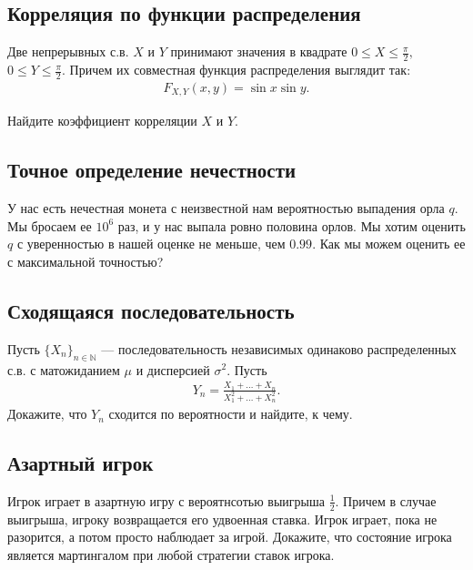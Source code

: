 \documentclass[12pt]{article}
\newcommand\N{\mathbb{N}}
\begin{document}
\subsection{Корреляция по функции распределения}

Две непрерывных с.в. $X$ и $Y$ принимают значения в квадрате $0 \le X \le \frac{\pi}{2},$ $0 \le Y \le \frac{\pi}{2}$. Причем их совместная функция распределения выглядит так:
\begin{align*}
    F_{X, Y} (x, y) = \sin x \sin y.
\end{align*}

Найдите коэффициент корреляции $X$ и $Y$.



\subsection{Точное определение нечестности}

У нас есть нечестная монета с неизвестной нам вероятностью выпадения орла $q$. Мы бросаем ее $10^6$ раз, и у нас выпала ровно половина орлов. Мы хотим оценить $q$ с уверенностью в нашей оценке не меньше, чем $0.99$. Как мы можем оценить ее с максимальной точностью? 



\subsection{Сходящаяся последовательность}

Пусть $\{X_n\}_{n \in \N}$ --- последовательность независимых одинаково распределенных с.в. с матожиданием $\mu$ и дисперсией $\sigma^2$. Пусть 
\begin{align*}
    Y_n = \frac{X_1 + \dots + X_n}{X_1^2 + \dots + X_n^2}.
\end{align*}
Докажите, что $Y_n$ сходится по вероятности и найдите, к чему.



\subsection{Азартный игрок}

Игрок играет в азартную игру с вероятнсотью выигрыша $\frac{1}{2}$. Причем в случае выигрыша, игроку возвращается его удвоенная ставка. Игрок играет, пока не разорится, а потом просто наблюдает за игрой. Докажите, что состояние игрока является мартингалом при любой стратегии ставок игрока.
\end{document}
